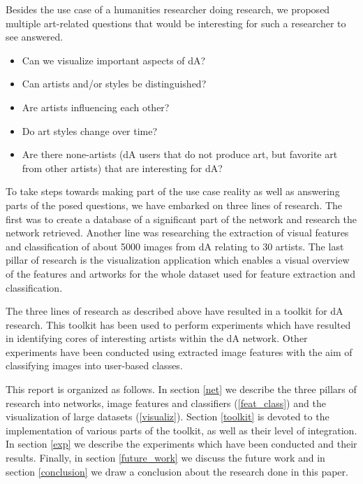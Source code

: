 Besides the use case of a humanities researcher doing research, we proposed multiple art-related questions that would be interesting for such a researcher to see answered.
\begin{itemize}
\item Can we visualize important aspects of dA?
\item Can artists and/or styles be distinguished?
\item Are artists influencing each other?
\item Do art styles change over time?
\item Are there none-artists (dA users that do not produce art, but favorite art from other artists) that are interesting for dA?
\end{itemize}

To take steps towards making part of the use case reality as well as answering parts of the posed questions, we have embarked on three lines of research. The first was to create a database of a significant part of the network and research the network retrieved. Another line was researching the extraction of visual features and classification of about 5000 images from dA relating to 30 artists. The last pillar of research is the visualization application which enables a visual overview of the features and artworks for the whole dataset used for feature extraction and classification.

The three lines of research as described above have resulted in a toolkit for dA research. This toolkit has been used to perform experiments which have resulted in identifying cores of interesting artists within the dA network. Other experiments have been conducted using extracted image features with the aim of classifying images into user-based classes.

This report is organized as follows. In section \ref{net} we describe the three pillars of research into networks, image features and classifiers (\ref{feat_class}) and the visualization of large datasets (\ref{visualiz}). Section \ref{toolkit} is devoted to the implementation of various parts of the toolkit, as well as their level of integration. In section \ref{exp} we describe the experiments which have been conducted and their results. Finally, in section \ref{future_work} we discuss the future work and in section \ref{conclusion} we draw a conclusion about the research done in this paper.